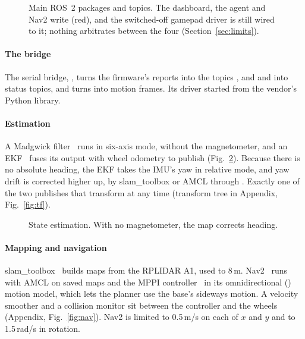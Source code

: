 \documentclass[11pt]{article}
\begin{document}
\begin{figure}[htbp]
  \centering
  \caption{Main ROS~2 packages and topics. The dashboard, the agent and Nav2 write  (red), and the switched-off gamepad driver is still wired to it; nothing arbitrates between the four (Section~\ref{sec:limits}).}
  \label{fig:rosgraph}
\end{figure}

\paragraph{The bridge} The serial bridge, , turns the firmware's reports into the topics ,  and  and into status topics, and turns  into motion frames. Its driver started from the vendor's Python library.

\paragraph{Estimation} A Madgwick filter~\cite{madgwick2010} runs in six-axis mode, without the magnetometer, and an EKF~\cite{moore2014ekf} fuses its output with wheel odometry to publish  (Fig.~\ref{fig:estimation}). Because there is no absolute heading, the EKF takes the IMU's yaw in relative mode, and yaw drift is corrected higher up, by slam\_toolbox or AMCL through . Exactly one of the two publishes that transform at any time (transform tree in Appendix, Fig.~\ref{fig:tf}).

\begin{figure}[htbp]
  \centering
  \caption{State estimation. With no magnetometer, the map corrects heading.}
  \label{fig:estimation}
\end{figure}

\paragraph{Mapping and navigation} slam\_toolbox~\cite{macenski2021slam} builds maps from the RPLIDAR A1, used to 8\,m. Nav2~\cite{macenski2020nav2} runs with AMCL on saved maps and the MPPI controller~\cite{williams2017mppi} in its omnidirectional () motion model, which lets the planner use the base's sideways motion. A velocity smoother and a collision monitor sit between the controller and the wheels (Appendix, Fig.~\ref{fig:nav}). Nav2 is limited to 0.5\,m/s on each of $x$ and $y$ and to 1.5\,rad/s in rotation.
\end{document}
